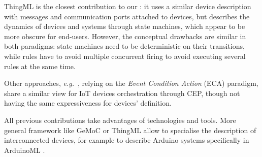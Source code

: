 ThingML \cite{harrand-16} is the closest contribution to our \DSL: it uses a similar device description with messages and communication ports attached to devices, but describes the dynamics of devices and systems through state machines, which appear to be more obscure for end-users. However, the conceptual drawbacks are similar in both paradigms: state machines need to be deterministic on their transitions, while rules have to avoid multiple concurrent firing to avoid executing several rules at the same time. 

Other approaches, \textit{e.g.}~\cite{cheng-16,bhandari-13}, relying on the \textit{Event Condition Action} (ECA) paradigm, share a similar view for IoT devices orchestration through CEP, though not having the same expressiveness for devices' definition.

All previous contributions take advantages of \MDE technologies and tools. More general \MDE framework like GeMoC \cite{bousse-16} or ThingML allow to specialise the description of interconnected devices, for example to describe Arduino systems specifically in ArduinoML \cite{mosser-14}.